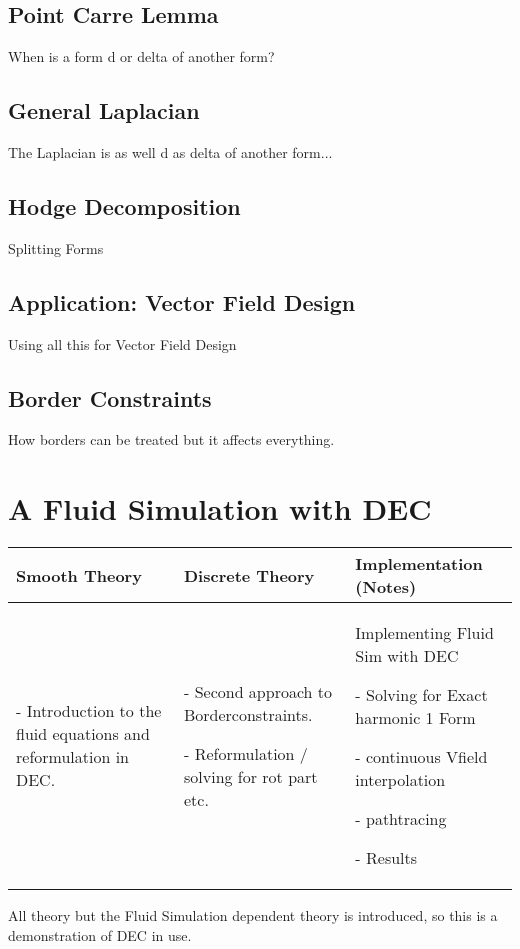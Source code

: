 \documentclass{scrartcl}
\newenvironment{packed_enum}{
\begin{enumerate}
  \setlength{\itemsep}{1pt}
  \setlength{\parskip}{0pt}
  \setlength{\parsep}{0pt}
}{\end{enumerate}}
\begin{document}
	\subsection{Point Carre Lemma}
	When is a form d or delta of another form?
	\subsection{General Laplacian}
	The Laplacian is as well d as delta of another form...
	\subsection{Hodge Decomposition}
	Splitting Forms
	\subsection{Application: Vector Field Design}
	Using all this for Vector Field Design
	\subsection{Border Constraints}
	How borders can be treated but it affects everything.
\newpage
\section{A Fluid Simulation with DEC}
	\begin{longtable}{|p{4.5cm}|p{4.5cm}|p{4.5cm}|}
		\hline
		Smooth Theory& Discrete Theory& Implementation (Notes)\\
		\hline
			\begin{packed_enum}
				\item[-] Introduction to the fluid equations and reformulation in DEC.
			\end{packed_enum}
			&
			\begin{packed_enum}
				\item[-] Second approach to Borderconstraints.
				\item[-] Reformulation / solving for rot part etc.
			\end{packed_enum}
			 & 
			 Implementing Fluid Sim with DEC
			 \begin{packed_enum}
				\item[-] Solving for Exact harmonic 1 Form
				\item[-] continuous Vfield interpolation
				\item[-] pathtracing
				\item[-] Results
			\end{packed_enum}
			 \\		
		\hline
	\end{longtable}
	All theory but the Fluid Simulation dependent theory is introduced, so this is a demonstration of DEC in use.
\end{document}
